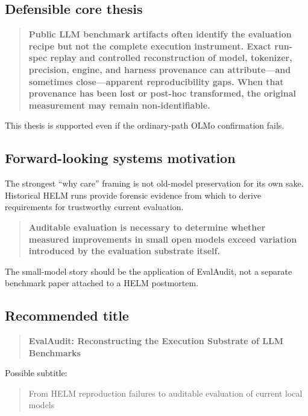 \documentclass[11pt]{article}
\begin{document}
\subsection{Defensible core thesis}

\begin{quote}
\textbf{Public LLM benchmark artifacts often identify the evaluation recipe but not the complete execution instrument. Exact run-spec replay and controlled reconstruction of model, tokenizer, precision, engine, and harness provenance can attribute---and sometimes close---apparent reproducibility gaps. When that provenance has been lost or post-hoc transformed, the original measurement may remain non-identifiable.}
\end{quote}

This thesis is supported even if the ordinary-path OLMo confirmation fails.

\subsection{Forward-looking systems motivation}

The strongest ``why care'' framing is not old-model preservation for its own sake. Historical HELM runs provide forensic evidence from which to derive requirements for trustworthy current evaluation.

\begin{quote}
\textbf{Auditable evaluation is necessary to determine whether measured improvements in small open models exceed variation introduced by the evaluation substrate itself.}
\end{quote}

The small-model story should be the application of EvalAudit, not a separate benchmark paper attached to a HELM postmortem.

\subsection{Recommended title}

\begin{quote}
\textbf{EvalAudit: Reconstructing the Execution Substrate of LLM Benchmarks}
\end{quote}

Possible subtitle:

\begin{quote}
From HELM reproduction failures to auditable evaluation of current local models
\end{quote}
\end{document}
